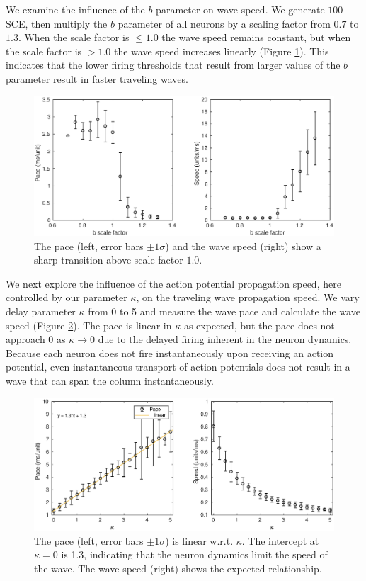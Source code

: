 We examine the influence of the $b$ parameter on wave speed.
We generate $100$ SCE, then multiply the $b$ parameter of all neurons by a scaling factor from $0.7$ to $1.3$.
When the scale factor is $\leq 1.0$ the wave speed remains constant, but when the scale factor is $>1.0$ the wave speed increases linearly (Figure \ref{fig:WaveSpeed_B}).
This indicates that the lower firing thresholds that result from larger values of the $b$ parameter result in faster traveling waves.

\begin{figure}[!htb]
 \centering
   \includegraphics[width=\textwidth]{fig/WaveSpeed_B}
   \caption{The pace (left, error bars $\pm 1 \sigma$) and the wave speed (right) show a sharp transition above scale factor $1.0$. }
   \label{fig:WaveSpeed_B}
\end{figure}

\FloatBarrier

We next explore the influence of the action potential propagation speed, here controlled by our parameter $\kappa$, on the traveling wave propagation speed.
We vary delay parameter $\kappa$ from 0 to 5 and measure the wave pace and calculate the wave speed (Figure \ref{fig:delay_speed}).
The pace is linear in $\kappa$ as expected, but the pace does not approach $0$ as $\kappa \rightarrow 0$ due to the delayed firing inherent in the neuron dynamics.
Because each neuron does not fire instantaneously upon receiving an action potential, even instantaneous transport of action potentials does not result in a wave that can span the column instantaneously.
\begin{figure}[!htb]
 \centering
   \includegraphics[width=\textwidth]{fig/WaveSpeed_Delay}
   \caption{The pace (left, error bars $\pm 1 \sigma$) is linear w.r.t. $\kappa$. The intercept at $\kappa=0$ is 1.3, indicating that the neuron dynamics limit the speed of the wave. 
	  The wave speed (right) shows the expected relationship. }
    \label{fig:delay_speed}
\end{figure}
\FloatBarrier

